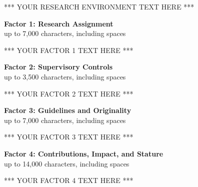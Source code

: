\documentclass[12pt]{article}
\begin{document}
*** YOUR RESEARCH ENVIRONMENT TEXT HERE ***





\vspace{10pt}
\centering \textbf{Factor 1: Research Assignment} \\
\centering up to 7,000 characters, including spaces \\
\raggedright





*** YOUR FACTOR 1 TEXT HERE ***





\vspace{10pt}
\centering \textbf{Factor 2: Supervisory Controls} \\
\centering up to 3,500 characters, including spaces \\
\raggedright





*** YOUR FACTOR 2 TEXT HERE ***





\vspace{10pt}
\centering \textbf{Factor 3: Guidelines and Originality} \\
\centering up to 7,000 characters, including spaces \\
\raggedright





*** YOUR FACTOR 3 TEXT HERE ***





\vspace{10pt}
\centering \textbf{Factor 4: Contributions, Impact, and Stature} \\
\centering up to 14,000 characters, including spaces \\
\raggedright





*** YOUR FACTOR 4 TEXT HERE ***
\end{document}
